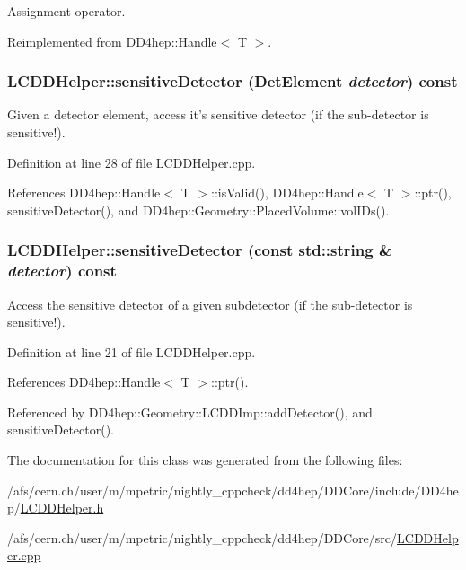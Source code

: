 Assignment operator. 

Reimplemented from \hyperlink{class_d_d4hep_1_1_handle_a9bbf8f498df42e81ad26fb00233505a6}{DD4hep::Handle$<$ T $>$}.\hypertarget{class_d_d4hep_1_1_geometry_1_1_l_c_d_d_helper_af83de2eda215c174f0cbe66c5877aefb}{
\subsubsection[{sensitiveDetector}]{ LCDDHelper::sensitiveDetector ({\bf DetElement} {\em detector}) const}}
\label{class_d_d4hep_1_1_geometry_1_1_l_c_d_d_helper_af83de2eda215c174f0cbe66c5877aefb}


Given a detector element, access it's sensitive detector (if the sub-\/detector is sensitive!). 

Definition at line 28 of file LCDDHelper.cpp.

References DD4hep::Handle$<$ T $>$::isValid(), DD4hep::Handle$<$ T $>$::ptr(), sensitiveDetector(), and DD4hep::Geometry::PlacedVolume::volIDs().\hypertarget{class_d_d4hep_1_1_geometry_1_1_l_c_d_d_helper_a0058b2f6c48397ed7883bbc7f1ad8fc2}{
\subsubsection[{sensitiveDetector}]{ LCDDHelper::sensitiveDetector (const std::string \& {\em detector}) const}}
\label{class_d_d4hep_1_1_geometry_1_1_l_c_d_d_helper_a0058b2f6c48397ed7883bbc7f1ad8fc2}


Access the sensitive detector of a given subdetector (if the sub-\/detector is sensitive!). 

Definition at line 21 of file LCDDHelper.cpp.

References DD4hep::Handle$<$ T $>$::ptr().

Referenced by DD4hep::Geometry::LCDDImp::addDetector(), and sensitiveDetector().

The documentation for this class was generated from the following files:\begin{DoxyCompactItemize}
\item 
/afs/cern.ch/user/m/mpetric/nightly\_\-cppcheck/dd4hep/DDCore/include/DD4hep/\hyperlink{_l_c_d_d_helper_8h}{LCDDHelper.h}\item 
/afs/cern.ch/user/m/mpetric/nightly\_\-cppcheck/dd4hep/DDCore/src/\hyperlink{_l_c_d_d_helper_8cpp}{LCDDHelper.cpp}\end{DoxyCompactItemize}
